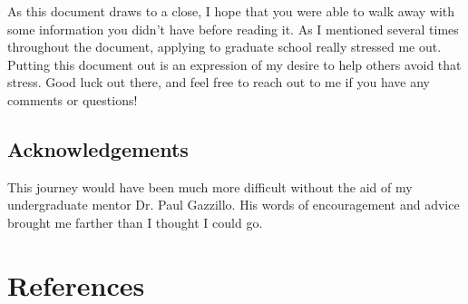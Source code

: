 \documentclass[12pt]{article}
\begin{document}
As this document draws to a close, I hope that you were able to walk away with some information you didn't have before reading it. As I mentioned several times throughout the document, applying to graduate school really stressed me out. Putting this document out is an expression of my desire to help others avoid that stress. Good luck out there, and feel free to reach out to me if you have any comments or questions!

\subsection{Acknowledgements}

This journey would have been much more difficult without the aid of my undergraduate mentor Dr. Paul Gazzillo. His words of encouragement and advice brought me farther than I thought I could go.

\section{References}

\printbibliography[heading=none]
\end{document}

